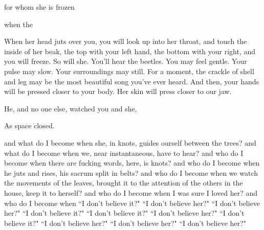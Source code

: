 \documentclass[11pt]{article}
\begin{document}
\begingroup
\begin{center}
for whom she is frozen
\rightskip\leftskip
\end{center}
\endgroup

\begingroup
\begin{center}
when the
\rightskip\leftskip
\end{center}
\endgroup

\vspace*{2\baselineskip}

\begingroup
When her head juts over you, you will look up into her throat, and touch the inside of her beak, the top with your left hand, the bottom with your right, and you will freeze. So will she. You'll hear the beetles. You may feel gentle. Your pulse may slow. Your surroundings may still. For a moment, the crackle of shell and leg may be the most beautiful song you've ever heard. And then, your hands will be pressed closer to your body. Her skin will press closer to our jaw.
\endgroup

\vspace*{2\baselineskip}

\begingroup
\begin{center}
He, and no one else, watched you and she,
\end{center}
\endgroup

\begingroup
\begin{center}
As space closed.
\end{center}
\endgroup

\vspace*{2\baselineskip}

\begingroup
\begin{center}
and what do I become when she, in knots, guides ourself between the trees? and what do I become when we, near instantaneous, have to hear? and who do I become when there are fucking words, here, is knots? and who do I become when he juts and rises, his sacrum split in belts? and who do I become when we watch the movements of the leaves, brought it to the attention of the others in the house, keep it to herself? and who do I become when I was sure I loved her? and who do I become when ``I don't believe it?" ``I don't believe her?" ``I don't believe her?" ``I don't believe it?" ``I don't believe it?" ``I don't believe her?" ``I don't believe it?" ``I don't believe her?" ``I don't believe her?" ``I don't believe her?"
\end{center}
\endgroup

\vspace*{2\baselineskip}
\end{document}
